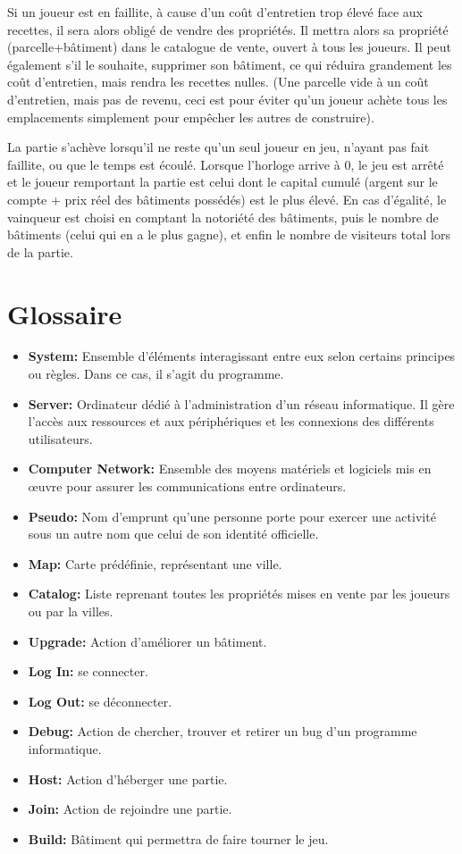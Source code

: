 \documentclass[a4paper,11pt]{report}
\begin{document}
Si un joueur est en faillite, à cause d'un coût d'entretien trop élevé face aux recettes, il sera alors obligé de vendre des propriétés. Il mettra alors sa propriété (parcelle+bâtiment) dans le catalogue de vente, ouvert à tous les joueurs.
Il peut également s'il le souhaite, supprimer son bâtiment, ce qui réduira grandement les coût d'entretien, mais rendra les recettes nulles. (Une parcelle vide à un coût d'entretien, mais pas de revenu, ceci est pour éviter qu'un joueur achète tous les emplacements simplement pour empêcher les autres de construire).

La partie s'achève lorsqu'il ne reste qu'un seul joueur en jeu, n'ayant pas fait faillite, ou que le temps est écoulé. Lorsque l'horloge arrive à 0, le jeu est arrêté et le joueur remportant la partie est celui dont le capital cumulé (argent sur le compte + prix réel des bâtiments possédés) est le plus élevé. En cas d'égalité, le vainqueur est choisi en comptant la notoriété des bâtiments, puis le nombre de bâtiments (celui qui en a le plus gagne), et enfin le nombre de visiteurs total lors de la partie.

\newpage
\section{Glossaire}
\begin{itemize}
 \item \textbf{System:} Ensemble d'éléments interagissant entre eux selon certains principes ou règles. Dans ce cas, il s’agit du programme.
 \item \textbf{Server:} Ordinateur dédié à l'administration d'un réseau informatique. Il gère l'accès aux ressources et aux périphériques et les connexions des différents utilisateurs.
 \item \textbf{Computer Network:} Ensemble des moyens matériels et logiciels mis en œuvre pour assurer les communications entre ordinateurs.
 \item \textbf{Pseudo:} Nom d'emprunt qu'une personne porte pour exercer une activité sous un autre nom que celui de son identité officielle.
 \item \textbf{Map:} Carte prédéfinie, représentant une ville.
 \item \textbf{Catalog:} Liste reprenant toutes les propriétés mises en vente par les joueurs ou par la villes.
 \item \textbf{Upgrade:} Action d'améliorer un bâtiment.
 \item \textbf{Log In:} se connecter.
 \item \textbf{Log Out:} se déconnecter.
 \item \textbf{Debug:} Action de chercher, trouver et retirer un bug d’un programme informatique.
 \item \textbf{Host:} Action d'héberger une partie.
 \item \textbf{Join:} Action de rejoindre une partie.
 \item \textbf{Build:} Bâtiment qui permettra de faire tourner le jeu.
\end{itemize}
\end{document}
